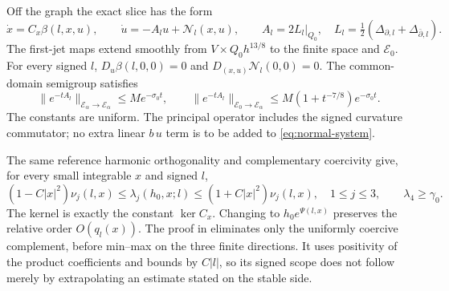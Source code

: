 \documentclass[11pt]{amsart}
\theoremstyle{definition}
\theoremstyle{remark}
\begin{document}
Off the graph the exact slice has the form
\begin{equation}\label{eq:normal-system}
 \dot x=C_x\beta(l,x,u),\qquad
 \dot u=-A_lu+\mathcal N_l(x,u),\qquad
 A_l=2L_l|_{Q_0},\quad
 L_l=\tfrac12(\Delta_{\partial,l}+\Delta_{\bar\partial,l}).
\end{equation}
The first-jet maps extend smoothly from
$V\times Q_0h^{13/8}$ to the finite space and $\mathcal E_0$.
For every signed $l$,
$D_u\beta(l,0,0)=0$ and $D_{(x,u)}\mathcal N_l(0,0)=0$.
The common-domain semigroup satisfies
\begin{equation}\label{eq:semigroup}
 \|e^{-tA_l}\|_{\mathcal E_\alpha\to\mathcal E_\alpha}
        \le Me^{-\sigma_0t},\qquad
 \|e^{-tA_l}\|_{\mathcal E_0\to\mathcal E_\alpha}
        \le M(1+t^{-7/8})e^{-\sigma_0t}.
\end{equation}
The constants are uniform. The principal operator includes the
signed curvature commutator; no extra linear $b\,u$ term is
to be added to \eqref{eq:normal-system}.

The same reference harmonic orthogonality and complementary
coercivity give, for every small integrable $x$ and signed $l$,
\begin{equation}\label{eq:static-spectrum}
 (1-C|x|^2)\nu_j(l,x)\le\lambda_j(h_0,x;l)
       \le(1+C|x|^2)\nu_j(l,x),\quad 1\le j\le3,\qquad
 \lambda_4\ge\gamma_0 .
\end{equation}
The kernel is exactly the constant $\ker C_x$.
Changing to $h_0e^{\Psi(l,x)}$ preserves the relative order
$O(q_l(x))$. The proof in \cite[Lemma 7.1]{WuebbenPhase26}
eliminates only the uniformly coercive complement, before
min--max on the three finite directions. It uses positivity
of the product coefficients and bounds by $C|l|$, so its
signed scope does not follow merely by extrapolating an
estimate stated on the stable side.
\end{document}
